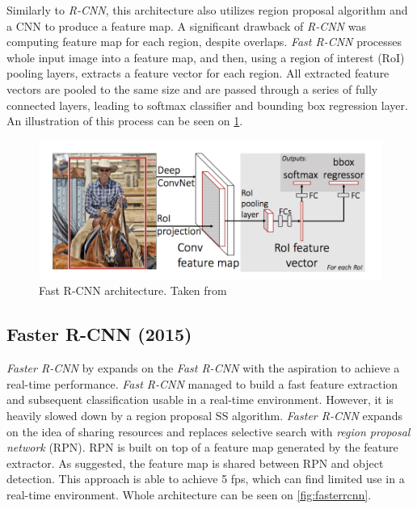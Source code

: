 Similarly to \textit{R-CNN}, this architecture also utilizes region proposal algorithm and a CNN to produce a feature map. A significant drawback of \textit{R-CNN} was computing feature map for each region, despite overlaps. \textit{Fast R-CNN} processes whole input image into a feature map, and then, using a region of interest (RoI) pooling layers, extracts a feature vector for each region. All extracted feature vectors are pooled to the same size and are passed through a series of fully connected layers, leading to softmax classifier and bounding box regression layer. An illustration of this process can be seen on \cref{fig:fastrcnn}.

\begin{figure}
    \centering
    \includegraphics[width=\textwidth]{img/fastrcnn}
    \caption[Fast R-CNN architecture]%
    {Fast R-CNN architecture. Taken from \cite[fig. 1]{bib:fastrcnn}}
    \label{fig:fastrcnn}
\end{figure}

\subsection{Faster R-CNN (2015)}
 
 \textit{Faster R-CNN} by \citeauthor{bib:fasterrcnn} \cite{bib:fasterrcnn} expands on the \textit{Fast R-CNN} with the aspiration to achieve a real-time performance. \textit{Fast R-CNN} managed to build a fast feature extraction and subsequent classification usable in a real-time environment. However, it is heavily slowed down by a region proposal SS algorithm. \textit{Faster R-CNN} expands on the idea of sharing resources and replaces selective search with \textit{region proposal network} (RPN). RPN is built on top of a feature map generated by the feature extractor. As suggested, the feature map is shared between RPN and object detection. This approach is able to achieve 5 fps, which can find limited use in a real-time environment. Whole architecture can be seen on \cref{fig:fasterrcnn}. 
 
